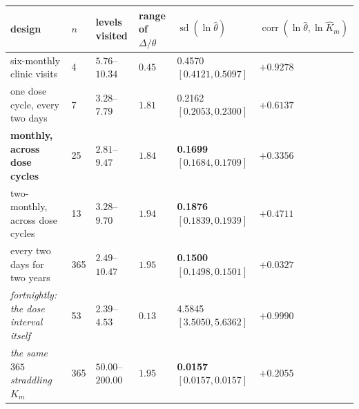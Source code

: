 \begin{tabular}{@{}llllll@{}}
\toprule
\textbf{design} & \textbf{$n$} & \textbf{levels visited} & \textbf{range of $\Delta/\theta$} & \textbf{$\operatorname{sd}(\ln\hat\theta)$} & \textbf{$\operatorname{corr}(\ln\hat\theta, \ln \hat K_m)$} \\
\midrule
six-monthly clinic visits & 4 & $5.76$--$10.34$ & $0.45$ & 0.4570\,\scriptsize$[0.4121, 0.5097]$ & $+0.9278$ \\
one dose cycle, every two days & 7 & $3.28$--$7.79$ & $1.81$ & 0.2162\,\scriptsize$[0.2053, 0.2300]$ & $+0.6137$ \\
\textbf{monthly, across dose cycles} & 25 & $2.81$--$9.47$ & $1.84$ & \textbf{0.1699}\,\scriptsize$[0.1684, 0.1709]$ & $+0.3356$ \\
two-monthly, across dose cycles & 13 & $3.28$--$9.70$ & $1.94$ & \textbf{0.1876}\,\scriptsize$[0.1839, 0.1939]$ & $+0.4711$ \\
every two days for two years & 365 & $2.49$--$10.47$ & $1.95$ & \textbf{0.1500}\,\scriptsize$[0.1498, 0.1501]$ & $+0.0327$ \\
\emph{fortnightly: the dose interval itself} & 53 & $2.39$--$4.53$ & $0.13$ & 4.5845\,\scriptsize$[3.5050, 5.6362]$ & $+0.9990$ \\
\emph{the same $365$ straddling $K_m$} & 365 & $50.00$--$200.00$ & $1.95$ & \textbf{0.0157}\,\scriptsize$[0.0157, 0.0157]$ & $+0.2055$ \\
\bottomrule
\end{tabular}
